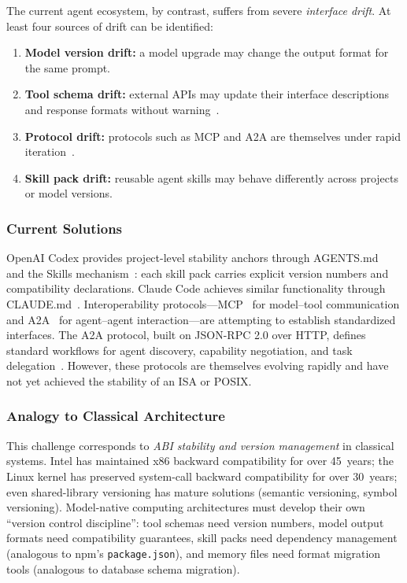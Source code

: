 \documentclass[11pt,a4paper]{article}
\begin{document}
The current agent ecosystem, by contrast, suffers from severe \emph{interface drift}.
At least four sources of drift can be identified:
\begin{enumerate}[nosep]
\item \textbf{Model version drift:} a model upgrade may change the output format for the same prompt.
\item \textbf{Tool schema drift:} external APIs may update their interface descriptions and response formats without warning~\cite{mcp_intro_2026}.
\item \textbf{Protocol drift:} protocols such as MCP and A2A are themselves under rapid iteration~\cite{agentprotocols2025,google_a2a_2025}.
\item \textbf{Skill pack drift:} reusable agent skills may behave differently across projects or model versions.
\end{enumerate}

\subsubsection{Current Solutions}
OpenAI Codex provides project-level stability anchors through AGENTS.md~\cite{openai_codex_agents_md_2026} and the Skills mechanism~\cite{openai_codex_skills_2026}: each skill pack carries explicit version numbers and compatibility declarations.
Claude Code achieves similar functionality through CLAUDE.md~\cite{anthropic_claudecode_memory_2026}.
Interoperability protocols---MCP~\cite{mcp_intro_2026} for model--tool communication and A2A~\cite{google_a2a_2025} for agent--agent interaction---are attempting to establish standardized interfaces.
The A2A protocol, built on JSON-RPC 2.0 over HTTP, defines standard workflows for agent discovery, capability negotiation, and task delegation~\cite{google_a2a_2025}.
However, these protocols are themselves evolving rapidly and have not yet achieved the stability of an ISA or POSIX.

\subsubsection{Analogy to Classical Architecture}
This challenge corresponds to \emph{ABI stability and version management} in classical systems.
Intel has maintained x86 backward compatibility for over 45~years; the Linux kernel has preserved system-call backward compatibility for over 30~years; even shared-library versioning has mature solutions (semantic versioning, symbol versioning).
Model-native computing architectures must develop their own ``version control discipline'': tool schemas need version numbers, model output formats need compatibility guarantees, skill packs need dependency management (analogous to npm's \texttt{package.json}), and memory files need format migration tools (analogous to database schema migration).
\end{document}
